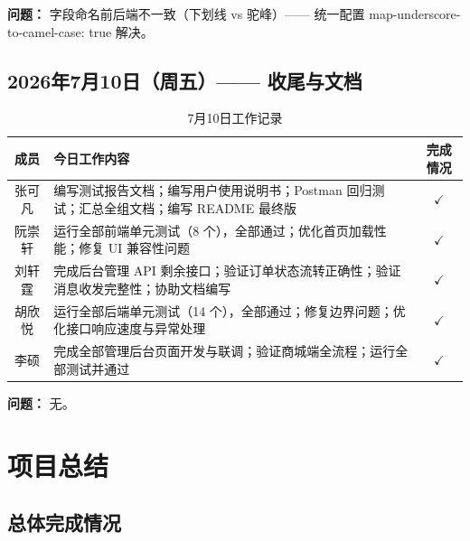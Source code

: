 \documentclass[12pt,a4paper,UTF8]{ctexart}
\begin{document}
\textbf{问题：} 字段命名前后端不一致（下划线 vs 驼峰）—— 统一配置 map-underscore-to-camel-case: true 解决。

\subsection{2026年7月10日（周五）—— 收尾与文档}

\begin{table}[H]
\centering
\caption{7月10日工作记录}
\begin{tabularx}{\textwidth}{c X c}
\toprule
\textbf{成员} & \textbf{今日工作内容} & \textbf{完成情况} \\
\midrule
张可凡 & 编写测试报告文档；编写用户使用说明书；Postman 回归测试；汇总全组文档；编写 README 最终版 & $\checkmark$ \\
\hline
阮崇轩 & 运行全部前端单元测试（8 个），全部通过；优化首页加载性能；修复 UI 兼容性问题 & $\checkmark$ \\
\hline
刘轩霆 & 完成后台管理 API 剩余接口；验证订单状态流转正确性；验证消息收发完整性；协助文档编写 & $\checkmark$ \\
\hline
胡欣悦 & 运行全部后端单元测试（14 个），全部通过；修复边界问题；优化接口响应速度与异常处理 & $\checkmark$ \\
\hline
李硕 & 完成全部管理后台页面开发与联调；验证商城端全流程；运行全部测试并通过 & $\checkmark$ \\
\bottomrule
\end{tabularx}
\end{table}

\textbf{问题：} 无。

\newpage
\section{项目总结}

\subsection{总体完成情况}
\end{document}
